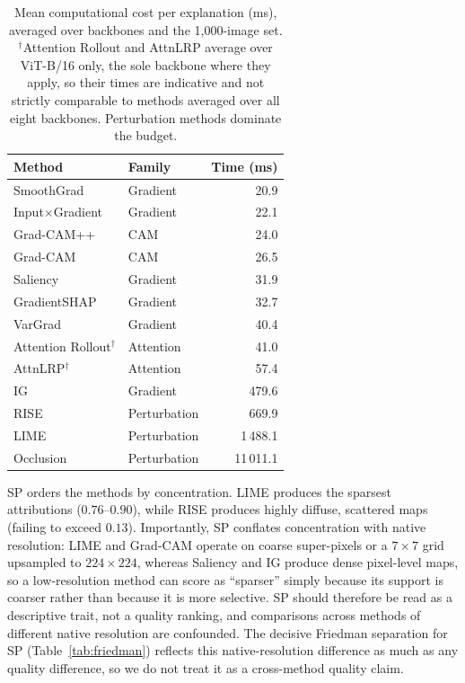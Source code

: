 \documentclass[final,5p,times,twocolumn]{elsarticle}
\begin{document}
\begin{table}[!t]
  \centering
  \caption{Mean computational cost per explanation (ms), averaged over backbones
  and the 1,000-image set. $^{\dagger}$Attention Rollout and AttnLRP average over ViT-B/16
  only, the sole backbone where they apply, so their times are indicative and not strictly
  comparable to methods averaged over all eight backbones. Perturbation methods
  dominate the budget.}
  \label{tab:cost}
  \setlength{\tabcolsep}{6pt}
  \begin{tabular}{@{}llr@{}}
    \toprule
    Method & Family & Time (ms) \\
    \midrule
    SmoothGrad            & Gradient      & 20.9 \\
    Input$\times$Gradient & Gradient      & 22.1 \\
    Grad-CAM++            & CAM           & 24.0 \\
    Grad-CAM              & CAM           & 26.5 \\
    Saliency              & Gradient      & 31.9 \\
    GradientSHAP          & Gradient      & 32.7 \\
    VarGrad               & Gradient      & 40.4 \\
    Attention Rollout$^{\dagger}$     & Attention     & 41.0 \\
    AttnLRP$^{\dagger}$               & Attention     & 57.4 \\
    IG  & Gradient      & 479.6 \\
    RISE                  & Perturbation  & 669.9 \\
    LIME                  & Perturbation  & 1\,488.1 \\
    Occlusion             & Perturbation  & 11\,011.1 \\
    \bottomrule
  \end{tabular}
\end{table}

SP orders the methods by concentration. LIME produces the sparsest attributions ($0.76$--$0.90$), while RISE produces highly diffuse, scattered maps (failing to exceed $0.13$). Importantly, SP conflates concentration with native resolution: LIME and Grad-CAM operate on coarse super-pixels or a $7 \times 7$ grid upsampled to $224 \times 224$, whereas Saliency and IG produce dense pixel-level maps, so a low-resolution method can score as ``sparser'' simply because its support is coarser rather than because it is more selective. SP should therefore be read as a descriptive trait, not a quality ranking, and comparisons across methods of different native resolution are confounded. The decisive Friedman separation for SP (Table~\ref{tab:friedman}) reflects this native-resolution difference as much as any quality difference, so we do not treat it as a cross-method quality claim.
\end{document}
